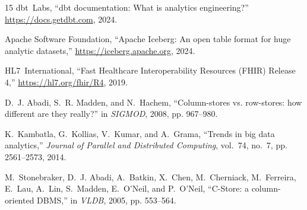 \documentclass[10pt,journal,compsoc]{IEEEtran}
\begin{document}
\begin{thebibliography}{15}
dbt~Labs, ``dbt documentation: What is analytics engineering?'' \url{https://docs.getdbt.com}, 2024.

Apache Software Foundation, ``Apache Iceberg: An open table format for huge analytic datasets,'' \url{https://iceberg.apache.org}, 2024.

HL7~International, ``Fast Healthcare Interoperability Resources (FHIR) Release 4,'' \url{https://hl7.org/fhir/R4}, 2019.

D.~J. Abadi, S.~R. Madden, and N.~Hachem, ``Column-stores vs. row-stores: how different are they really?'' in \emph{SIGMOD}, 2008, pp. 967--980.

K.~Kambatla, G.~Kollias, V.~Kumar, and A.~Grama, ``Trends in big data analytics,'' \emph{Journal of Parallel and Distributed Computing}, vol.~74, no.~7, pp. 2561--2573, 2014.

M.~Stonebraker, D.~J. Abadi, A.~Batkin, X.~Chen, M.~Cherniack, M.~Ferreira, E.~Lau, A.~Lin, S.~Madden, E.~O'Neil, and P.~O'Neil, ``C-Store: a column-oriented DBMS,'' in \emph{VLDB}, 2005, pp. 553--564.
\end{thebibliography}
\end{document}
